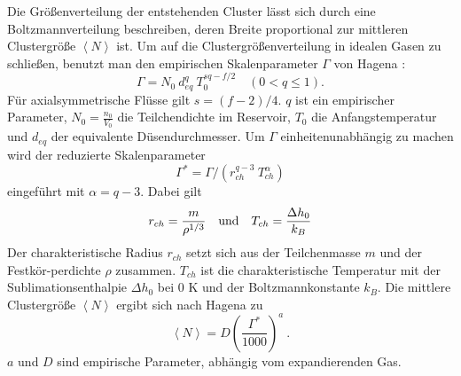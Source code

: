 %
Die Größenverteilung der entstehenden Cluster lässt sich durch eine Boltzmannverteilung beschreiben, deren Breite proportional zur mittleren Clustergröße $\left\langle N \right\rangle$ ist. Um auf die Clustergrößenverteilung in idealen Gasen zu schließen, benutzt man den empirischen Skalenparameter $\Gamma$ von Hagena \cite{hagena1987}:
%
\begin{equation} \label{eq:Skalenparameter}
\Gamma = N_0\ d_{eq}^q\ T_0^{sq - f/2} \quad (0 < q \leq 1).
\end{equation}
%
Für axialsymmetrische Flüsse gilt $s = (f-2)/4$. $q$ ist ein empirischer Parameter, $N_0 = \frac{n_0}{V_0}$ die Teilchendichte im Reservoir, $T_0$ die Anfangstemperatur und $d_{eq}$ der equivalente Düsendurchmesser. 
Um $\Gamma$ einheitenunabhängig zu machen wird der reduzierte Skalenparameter
%
\begin{equation} \label{eq:RedSkalenparameter}
\Gamma^* = \Gamma / (r_{ch}^{q-3}\ T_{ch}^{\alpha})
\end{equation}
%
eingeführt mit $\alpha= q - 3$. Dabei gilt
%
\begin{equation}
r_{ch} = \frac{m}{\rho ^{1/3}}\quad \textmd{und}\quad T_{ch}= \frac{ \Delta h_0}{k_B}
\end{equation}
%
Der charakteristische Radius $r_{ch}$ setzt sich aus der Teilchenmasse $m$ und der Festkör-perdichte $\rho$ zusammen. $T_{ch}$ ist die charakteristische Temperatur mit der Sublimationsenthalpie $\Delta h_0$ bei 0 K  und der Boltzmannkonstante $k_B$.  Die mittlere Clustergröße $\left\langle N \right\rangle $ ergibt sich nach Hagena zu
%
\begin{equation} \label{eq:HagOriginalFormel}
\left\langle N \right\rangle  = D \left( \frac{\Gamma^*}{1000}\right)^a \:.
\end{equation}
%
$a$ und $D$ sind empirische Parameter, abhängig vom expandierenden Gas.
